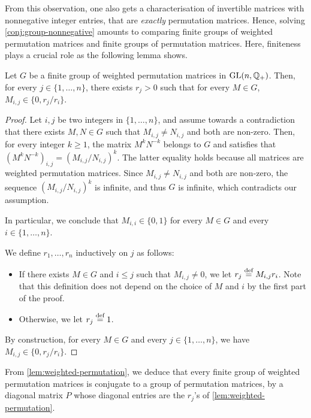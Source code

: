 From this observation, one also gets a characterisation of invertible matrices
with nonnegative integer entries, that are \emph{exactly} permutation matrices.
Hence, solving \cref{conj:group-nonnegative} amounts to comparing finite groups
of weighted permutation matrices and finite groups of permutation matrices.
Here, finiteness plays a crucial role as the following lemma shows.

\begin{lemma}
  \label{lem:weighted-permutation}
  Let $G$ be a finite group of weighted permutation matrices in
  $\GL[n]{\Rat_+}$. Then, for every $j \in \{1, \ldots, n\}$, 
  there exists $r_j > 0$ such that
  for every $M \in G$, 
  $M_{i,j} \in \{0, r_j / r_i\}$.
\end{lemma}
\begin{proof}
  Let $i, j$ be two integers in $\{1, \ldots, n\}$, and assume towards a
  contradiction that there exists $M, N \in G$ such that $M_{i,j} \neq N_{i,j}$
  and both are non-zero. Then, for every integer $k \geq 1$, the matrix $M^k
  N^{-k}$ belongs to $G$ and satisfies that $(M^k N^{-k})_{i,j} =
  (M_{i,j}/N_{i,j})^k$. The latter equality holds because all matrices are
  weighted permutation matrices. Since $M_{i,j} \neq N_{i,j}$ and both are
  non-zero, the sequence $(M_{i,j}/N_{i,j})^k$ is infinite, and thus $G$ is
  infinite, which contradicts our assumption.

  In particular, we conclude that $M_{i,i} \in \{0, 1\}$ for every $M \in G$
  and every $i \in \{1, \ldots, n\}$.

  We define $r_1, \ldots, r_n$ inductively on $j$ as follows:
  \begin{itemize}
    \item If there exists $M \in G$ and $i \leq j$ such that $M_{i,j} \neq 0$,
      we let $r_j \defined M_{i,j} r_i$. Note that this definition does not depend on
      the choice of $M$ and $i$ by the first part of the proof.
    \item Otherwise, we let $r_j \defined 1$.
  \end{itemize}
  By construction, for every $M \in G$ and every $j \in \{1, \ldots, n\}$,
  we have $M_{i,j} \in \{0, r_j / r_i\}$.
\end{proof}

From \cref{lem:weighted-permutation}, we deduce that
every finite group of weighted permutation matrices is conjugate to a group
of permutation matrices, by a diagonal matrix $P$ whose diagonal entries are
the $r_j$'s of \cref{lem:weighted-permutation}. 

